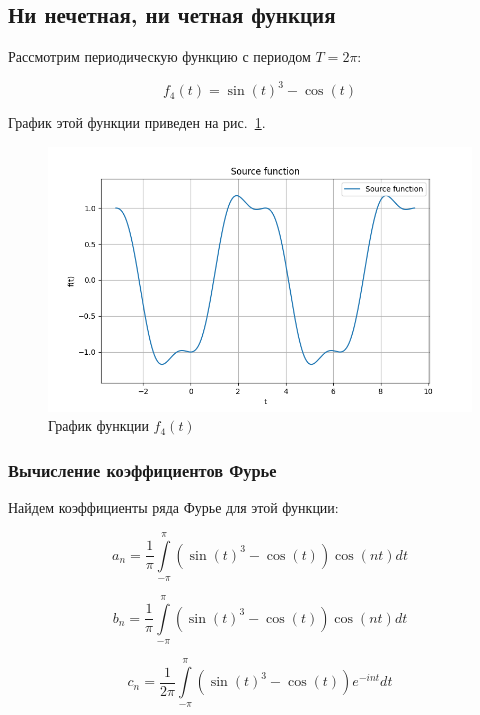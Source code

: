 \subsection{Ни нечетная, ни четная функция}

Рассмотрим периодическую функцию с периодом $T = 2\pi$:

\begin{equation}
    f_4(t) = \sin(t)^3 - \cos(t)
\end{equation}

График этой функции приведен на рис.~\ref{fig:func_4}.

\begin{figure}[ht!]
    \centering
    \includegraphics[width=\textwidth]{media/plots/func_4.png}
    \caption{График функции $f_4(t)$}
    \label{fig:func_4}
\end{figure}

\subsubsection{Вычисление коэффициентов Фурье}
Найдем коэффициенты ряда Фурье для этой функции:

\begin{equation}
    a_n = \frac{1}{\pi}\int\limits_{-\pi}^{\pi} (\sin(t)^3 - \cos(t)) \cos(n t) dt 
\end{equation}

\begin{equation}
    b_n = \frac{1}{\pi}\int\limits_{-\pi}^{\pi} (\sin(t)^3 - \cos(t)) \cos(n t) dt 
\end{equation}

\begin{equation}
    c_n = \frac{1}{2\pi}\int\limits_{-\pi}^{\pi} (\sin(t)^3 - \cos(t)) e^{-int} dt
\end{equation}

